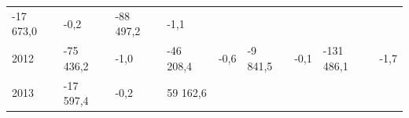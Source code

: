 \begin{longtable}[]{@{}lllllllll@{}}
\begin{minipage}[t]{0.12\columnwidth}
-17 673,0\strut
\end{minipage} & \begin{minipage}[t]{0.06\columnwidth}\raggedright
-0,2\strut
\end{minipage} & \begin{minipage}[t]{0.09\columnwidth}\raggedright
-88 497,2\strut
\end{minipage} & \begin{minipage}[t]{0.06\columnwidth}\raggedright
-1,1\strut
\end{minipage}\tabularnewline
\begin{minipage}[t]{0.05\columnwidth}\raggedright
2012\strut
\end{minipage} & \begin{minipage}[t]{0.10\columnwidth}\raggedright
-75 436,2\strut
\end{minipage} & \begin{minipage}[t]{0.06\columnwidth}\raggedright
-1,0\strut
\end{minipage} & \begin{minipage}[t]{0.16\columnwidth}\raggedright
-46 208,4\strut
\end{minipage} & \begin{minipage}[t]{0.06\columnwidth}\raggedright
-0,6\strut
\end{minipage} & \begin{minipage}[t]{0.12\columnwidth}\raggedright
-9 841,5\strut
\end{minipage} & \begin{minipage}[t]{0.06\columnwidth}\raggedright
-0,1\strut
\end{minipage} & \begin{minipage}[t]{0.09\columnwidth}\raggedright
-131 486,1\strut
\end{minipage} & \begin{minipage}[t]{0.06\columnwidth}\raggedright
-1,7\strut
\end{minipage}\tabularnewline
\begin{minipage}[t]{0.05\columnwidth}\raggedright
2013\strut
\end{minipage} & \begin{minipage}[t]{0.10\columnwidth}\raggedright
-17 597,4\strut
\end{minipage} & \begin{minipage}[t]{0.06\columnwidth}\raggedright
-0,2\strut
\end{minipage} & \begin{minipage}[t]{0.16\columnwidth}\raggedright
59 162,6\strut

\end{minipage}
\end{longtable}
